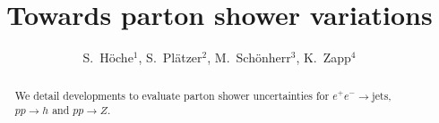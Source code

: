 \documentclass[11pt]{cernrep}
\begin{document}
\title{Towards parton shower variations}

\author{
  S.\ H\"oche$^1$,
  S.\ Pl\"atzer$^2$,
  M.\ Sch\"onherr$^3$,
  K.\ Zapp$^4$
}

\maketitle

\begin{abstract}
  We detail developments to evaluate parton shower uncertainties 
  for $e^+e^-\to\text{jets}$, $pp\to h$ and $pp\to Z$.
\end{abstract}






\end{document}
